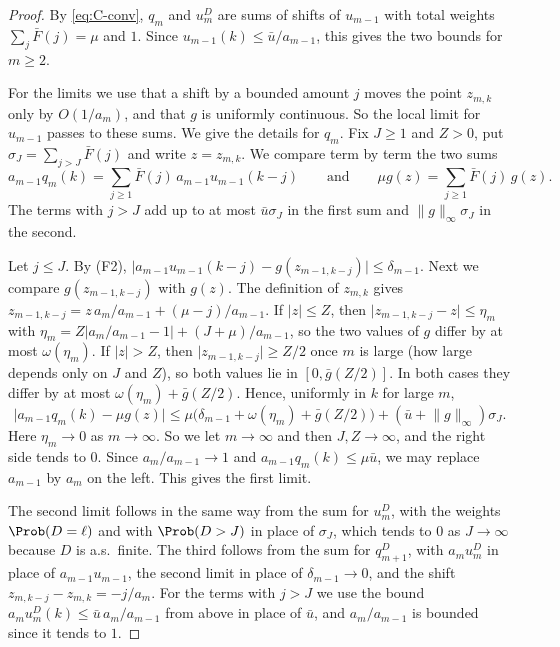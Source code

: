 \begin{proof}
By \eqref{eq:C-conv}, $q_m$ and $u^D_m$ are sums of shifts of $u_{m-1}$ with total
weights $\sum_j\bar F(j)=\mu$ and $1$. Since $u_{m-1}(k)\le\bar u/a_{m-1}$, this gives the
two bounds for $m\ge2$.

For the limits we use that a shift by a bounded amount $j$ moves the point $z_{m,k}$ only
by $O(1/a_m)$, and that $g$ is uniformly continuous. So the local limit for $u_{m-1}$
passes to these sums. We give the details for $q_m$. Fix $J\ge1$ and $Z>0$, put
$\sigma_J=\sum_{j>J}\bar F(j)$ and write $z=z_{m,k}$. We compare term by term the two sums
\[
a_{m-1}q_m(k)=\sum_{j\ge1}\bar F(j)\,a_{m-1}u_{m-1}(k-j)\qquad\text{and}\qquad
\mu g(z)=\sum_{j\ge1}\bar F(j)\,g(z).
\]
The terms with $j>J$ add up to at most $\bar u\sigma_J$ in the first sum and
$\lVert g\rVert_\infty\sigma_J$ in the second.

Let $j\le J$. By (F2),
$\lvert a_{m-1}u_{m-1}(k-j)-g(z_{m-1,k-j})\rvert\le\delta_{m-1}$. Next we compare
$g(z_{m-1,k-j})$ with $g(z)$. The definition of $z_{m,k}$ gives
$z_{m-1,k-j}=z\,a_m/a_{m-1}+(\mu-j)/a_{m-1}$. If $\lvert z\rvert\le Z$, then
$\lvert z_{m-1,k-j}-z\rvert\le\eta_m$ with
$\eta_m=Z\lvert a_m/a_{m-1}-1\rvert+(J+\mu)/a_{m-1}$, so the two values of $g$ differ by
at most $\omega(\eta_m)$. If $\lvert z\rvert>Z$, then
$\lvert z_{m-1,k-j}\rvert\ge Z/2$ once $m$ is large (how large depends only on $J$ and
$Z$), so both values lie in $[0,\bar g(Z/2)]$. In both cases they differ by at most
$\omega(\eta_m)+\bar g(Z/2)$. Hence, uniformly in $k$ for large $m$,
\[
\bigl\lvert a_{m-1}q_m(k)-\mu g(z)\bigr\rvert
\le\mu\bigl(\delta_{m-1}+\omega(\eta_m)+\bar g(Z/2)\bigr)
+(\bar u+\lVert g\rVert_\infty)\sigma_J .
\]
Here $\eta_m\to0$ as $m\to\infty$. So we let $m\to\infty$ and then $J,Z\to\infty$, and
the right side tends to $0$. Since $a_m/a_{m-1}\to1$ and $a_{m-1}q_m(k)\le\mu\bar u$, we
may replace $a_{m-1}$ by $a_m$ on the left. This gives the first limit.

The second limit follows in the same way from the sum for $u^D_m$, with the weights
$\Prob(D=\ell)$ and with $\Prob(D>J)$ in place of $\sigma_J$, which tends to $0$ as
$J\to\infty$ because $D$ is a.s.\ finite. The third follows from the sum for $q^D_{m+1}$, with
$a_mu^D_m$ in place of $a_{m-1}u_{m-1}$, the second limit in place of $\delta_{m-1}\to0$,
and the shift $z_{m,k-j}-z_{m,k}=-j/a_m$. For the terms with $j>J$ we use the bound
$a_mu^D_m(k)\le\bar u\,a_m/a_{m-1}$ from above in place of $\bar u$, and $a_m/a_{m-1}$ is
bounded since it tends to $1$.
\end{proof}

